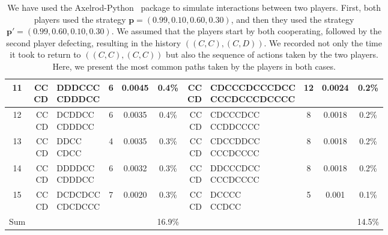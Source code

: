\documentclass[11pt]{article}
\theoremstyle{plainCl1}
\theoremstyle{plainCl2}
\begin{document}
\begin{table}
{\begin{tabular}{c|rlccc|rlccc}
    11 &  \cellcolor{gray!25} \makecell[r]{CC \\ CD} & \makecell[l]{ DDDCCC \\   CDDDCC} &  6 &  0.0045 & 0.4\%  &   \cellcolor{gray!25} \makecell[r]{CC \\ CD} & \makecell[l]{ CDCCCDCCCDCC \\  CCCDCCCDCCCC} &  12 &   0.0024 & 0.2\% \\ \hline
    12 &  \cellcolor{gray!25} \makecell[r]{CC \\ CD} & \makecell[l]{ DCDDCC \\   CDDDCC} &  6 &  0.0035 & 0.4\%  &   \cellcolor{gray!25} \makecell[r]{CC \\ CD} & \makecell[l]{     CDCCCDCC \\      CCDDCCCC} &   8 &   0.0018 & 0.2\% \\ \hline
    13 &  \cellcolor{gray!25} \makecell[r]{CC \\ CD} & \makecell[l]{   DDCC \\     CDCC} &  4 &  0.0035 & 0.3\%  &   \cellcolor{gray!25} \makecell[r]{CC \\ CD} & \makecell[l]{     CDCCDDCC \\      CCCDCCCC} &   8 &   0.0018 & 0.2\% \\ \hline
    14 &  \cellcolor{gray!25} \makecell[r]{CC \\ CD} & \makecell[l]{ DDDDCC \\   CDDDCC} &  6 &  0.0032 & 0.3\%  &   \cellcolor{gray!25} \makecell[r]{CC \\ CD} & \makecell[l]{     DDCCCDCC \\      CCCDCCCC} &   8 &   0.0018 & 0.2\% \\ \hline
    15 &  \cellcolor{gray!25} \makecell[r]{CC \\ CD} & \makecell[l]{DCDCDCC \\  CDCDCCC} &  7 &  0.0020 & 0.3\%  &   \cellcolor{gray!25} \makecell[r]{CC \\ CD} & \makecell[l]{        DCCCC \\         CCDCC} &   5 &   0.001 & 0.1\% \\  \hline
    Sum & & &  &  & 16.9\% & & & &  & 14.5\% \\
    \bottomrule
    \end{tabular}}
    \caption{We have used the Axelrod-Python~\cite{AxelrodPython} package to simulate interactions between two players. First, both players used the strategy \(\mathbf{p} = (0.99, 0.10, 0.60, 0.30)\), and then they used the strategy \(\mathbf{p'} = (0.99, 0.60, 0.10, 0.30)\). We assumed that the players start by both cooperating, followed by the second player defecting, resulting in the history \( ((C, C), (C, D)) \). We recorded not only the time it took to return to \( ((C, C), (C, C)) \) but also the sequence of actions taken by the two players. Here, we present the most common paths taken by the players in both cases.
}
\end{table}
\end{document}
